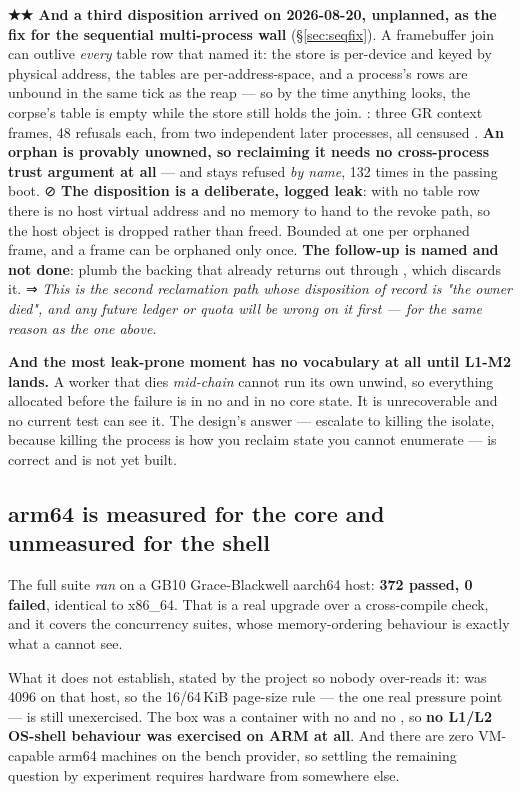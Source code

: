 \documentclass[10.5pt]{article}
\begin{document}
\textbf{★★ And a third disposition arrived on 2026-08-20, unplanned, as the fix for the
sequential multi-process wall} (\S\ref{sec:seqfix}). A framebuffer join can outlive \emph{every}
table row that named it: the store is per-device and keyed by physical address, the tables are
per-address-space, and a process's rows are unbound in the same tick as the reap --- so by the
time anything looks, the corpse's table is empty while the store still holds the join.
\measured{} : three GR context frames, 48 refusals each, from two independent later
processes, all censused . \textbf{An orphan is provably unowned, so
reclaiming it needs no cross-process trust argument at all} --- and  stays refused
\emph{by name}, 132 times in the passing boot. ⊘ \textbf{The disposition is a deliberate,
logged leak}: with no table row there is no host virtual address and no memory to hand to the
revoke path, so the host object is dropped rather than freed. Bounded at one per orphaned frame,
and a frame can be orphaned only once. \textbf{The follow-up is named and not done}: plumb the
backing that  already returns out through
, which discards it. ⇒ \emph{This is the second reclamation
path whose disposition of record is "the owner died", and any future ledger or quota will be wrong
on it first --- for the same reason as the one above.}

\textbf{And the most leak-prone moment has no vocabulary at all until L1-M2 lands.} A worker that
dies \emph{mid-chain} cannot run its own unwind, so everything allocated before the failure is in
no  and in no core state. It is unrecoverable and no current test can see it. The
design's answer — escalate to killing the isolate, because killing the process is how you reclaim
state you cannot enumerate — is correct and is not yet built.

\subsection{arm64 is measured for the core and unmeasured for the shell}

The full suite \emph{ran} on a GB10 Grace-Blackwell aarch64 host: \textbf{372 passed, 0 failed},
identical to x86\_64. That is a real upgrade over a cross-compile check, and it covers the
concurrency suites, whose memory-ordering behaviour is exactly what a  cannot
see.

What it does not establish, stated by the project so nobody over-reads it: 
was 4096 on that host, so the 16/64\,KiB page-size rule — the one real pressure point — is still
unexercised. The box was a container with no  and no , so
\textbf{no L1/L2 OS-shell behaviour was exercised on ARM at all}. And there are zero
VM-capable arm64 machines on the bench provider, so settling the remaining question by experiment
requires hardware from somewhere else.
\end{document}
